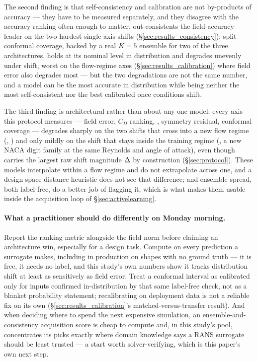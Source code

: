 \documentclass[11pt,a4paper]{article}
\begin{document}
The second finding is that self-consistency and calibration are not
by-products of accuracy --- they have to be measured separately, and they
disagree with the accuracy ranking often enough to matter. \Mfno{} out-consistents
the field-accuracy leader \Mtrans{} on the two hardest single-axis shifts
(\S\ref{sec:results_consistency}); split-conformal coverage, backed by a real
$K=5$ ensemble for two of the three architectures, holds at its nominal level
in distribution and degrades unevenly under shift, worst on the flow-regime
axes (\S\ref{sec:results_calibration}) where field error also degrades most ---
but the two degradations are not the same number, and a model can be the most
accurate in distribution while being neither the most self-consistent nor the
best calibrated once conditions shift.

The third finding is architectural rather than about any one model: every
axis this protocol measures --- field error, $C_D$ ranking, \FSC, symmetry
residual, conformal coverage --- degrades sharply on the two shifts that cross
into a new flow regime (, ) and only mildly
on the shift that stays inside the training regime (, a new
NACA digit family at the same Reynolds and angle of attack), even though
 carries the largest raw shift magnitude
$\Delta$ by construction (\S\ref{sec:protocol}). These models interpolate
within a flow regime and do not extrapolate across one, and a
design-space-distance heuristic does not see that difference; \FSC{} and
ensemble spread, both label-free, do a better job of flagging it, which is
what makes them usable inside the acquisition loop of
\S\ref{sec:activelearning}.

\paragraph{What a practitioner should do differently on Monday morning.} Report
the ranking metric alongside the field norm before claiming an architecture
win, especially for a design task. Compute \FSC{} on every prediction a
surrogate makes, including in production on shapes with no ground truth --- it
is free, it needs no label, and this study's own numbers show it tracks
distribution shift at least as sensitively as field error. Treat a conformal
interval as calibrated only for inputs confirmed in-distribution by that same
label-free check, not as a blanket probability statement; recalibrating on
deployment data is not a reliable fix on its own (\S\ref{sec:results_calibration}'s
matched-versus-transfer result). And when deciding where to spend the next
expensive simulation, an ensemble-and-consistency acquisition score is cheap
to compute and, in this study's pool, concentrates its picks exactly where
domain knowledge says a RANS surrogate should be least trusted --- a start
worth solver-verifying, which is this paper's own next step.
\end{document}
